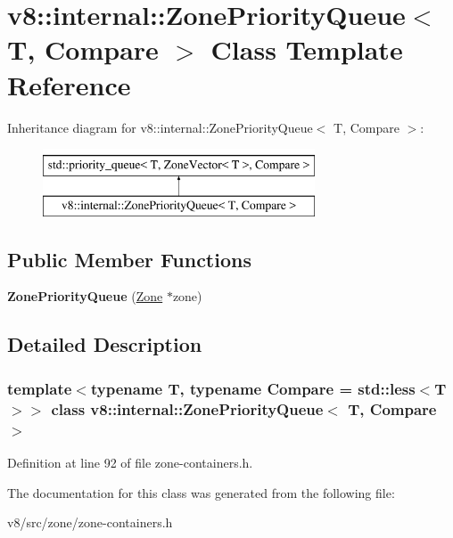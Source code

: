 \hypertarget{classv8_1_1internal_1_1ZonePriorityQueue}{}\section{v8\+:\+:internal\+:\+:Zone\+Priority\+Queue$<$ T, Compare $>$ Class Template Reference}
\label{classv8_1_1internal_1_1ZonePriorityQueue}
Inheritance diagram for v8\+:\+:internal\+:\+:Zone\+Priority\+Queue$<$ T, Compare $>$\+:\begin{figure}[H]
\begin{center}
\leavevmode
\includegraphics[height=2.000000cm]{classv8_1_1internal_1_1ZonePriorityQueue}
\end{center}
\end{figure}
\subsection*{Public Member Functions}
\begin{DoxyCompactItemize}
\item 
\mbox{\label{classv8_1_1internal_1_1ZonePriorityQueue_aa93008febe3107a1fca2e37141abaf05}} 
{\bfseries Zone\+Priority\+Queue} (\mbox{\hyperlink{classv8_1_1internal_1_1Zone}{Zone}} $\ast$zone)
\end{DoxyCompactItemize}


\subsection{Detailed Description}
\subsubsection*{template$<$typename T, typename Compare = std\+::less$<$\+T$>$$>$\newline
class v8\+::internal\+::\+Zone\+Priority\+Queue$<$ T, Compare $>$}



Definition at line 92 of file zone-\/containers.\+h.



The documentation for this class was generated from the following file\+:\begin{DoxyCompactItemize}
\item 
v8/src/zone/zone-\/containers.\+h\end{DoxyCompactItemize}
